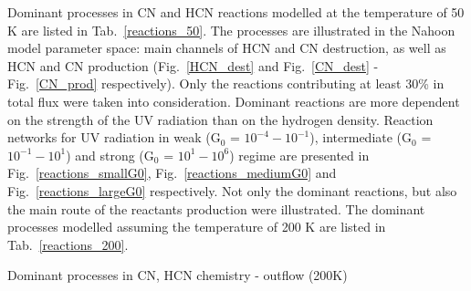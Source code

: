 \documentclass{aa}
\begin{document}
\begin{appendix}
Dominant processes in CN and HCN reactions modelled at the temperature of 50 K are listed in Tab.~\ref{reactions_50}. The processes are illustrated in the Nahoon model parameter space: main channels of HCN and CN destruction, as well as HCN and CN production (Fig.~\ref{HCN_dest} and Fig.~\ref{CN_dest} - Fig.~\ref{CN_prod} respectively). Only the reactions contributing at least 30\% in total flux were taken into consideration. Dominant reactions are more dependent on the strength of the UV radiation than on the hydrogen density. Reaction networks for UV radiation in weak (G$_0$ = $10^{-4} - 10^{-1}$), intermediate (G$_0$ = $10^{-1} - 10^{1}$) and strong (G$_0$ = $10^{1} - 10^{6}$) regime are presented in Fig.~\ref{reactions_smallG0}, Fig.~\ref{reactions_mediumG0} and Fig.~\ref{reactions_largeG0} respectively. Not only the dominant reactions, but also the main route of the reactants production were illustrated. The dominant processes modelled assuming the temperature of 200 K are listed in Tab.~\ref{reactions_200}.

\begin{table*} 
\caption{Dominant processes in CN, HCN chemistry - outflow (200K)}             %
\label{reactions_200}      %
               

\end{table*}
\end{appendix}
\end{document}
